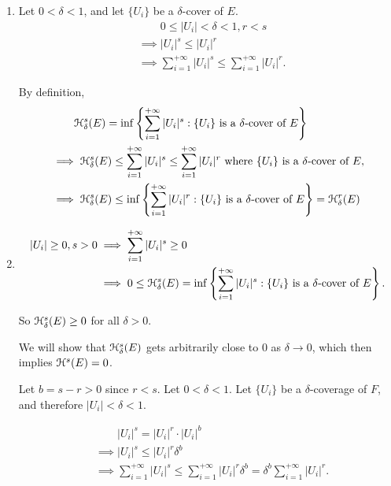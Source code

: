 \begin{enumerate}
    \item Let \(0 < \delta < 1\), and let \(\{U_i\}\) be a \(\delta\)-cover of \(E\).
    \begin{align*}
        &\phantom{\implies} 0 \leq |U_i| < \delta < 1, r < s\\
        &\implies |U_i|^s \leq |U_i|^r\\
        &\implies \sum_{i = 1}^{+\infty} |U_i|^s \leq \sum_{i = 1}^{+\infty} |U_i|^r.
    \end{align*}

    By definition,
    \begin{align*}
        &\phantom{\implies} \mathcal{H}_\delta^s(E) = \inf \left\{\sum_{i = 1}^{+\infty} |U_i|^s : \{U_i\} \text{ is a } \delta\text{-cover of } E\right\}\\
        &\implies \mathcal{H}_{\delta}^s(E) \leq \sum_{i = 1}^{+\infty} |U_i|^s \leq \sum_{i = 1}^{+\infty} |U_i|^r\text{ where } \{U_i\} \text{ is a } \delta\text{-cover of } E, \\
        &\implies \mathcal{H}_\delta^s(E) \leq \inf\left\{\sum_{i = 1}^{+\infty} |U_i|^r : \{U_i\} \text{ is a } \delta\text{-cover of } E\right\} = \mathcal{H}_\delta^r(E)
    \end{align*}

    \item
    \begin{align*}
        |U_i| \geq 0, s > 0 &\implies \sum_{i = 1}^{+\infty} |U_i|^s \geq 0\\
        &\implies 0 \leq \mathcal{H}_{\delta}^s(E) =  \inf \left\{\sum_{i = 1}^{+\infty} |U_i|^s : \{U_i\} \text{ is a } \delta\text{-cover of } E\right\}.
    \end{align*}

    So \(\mathcal{H}_{\delta}^s (E) \geq 0 \) for all \( \delta > 0\).

    We will show that \(\mathcal{H}_{\delta}^s(E)\) gets arbitrarily close to \(0\) as \(\delta \to 0\), which then implies \(\mathcal{H}^s(E) = 0\).

    Let \(b = s - r > 0\) since \(r < s\). Let \(0 < \delta < 1\). Let \(\{U_i\}\) be a \(\delta\)-coverage of \(F\), and therefore \(|U_i| < \delta < 1\).

    \begin{align*}
        &\phantom{\implies} |U_i|^s = |U_i|^r \cdot |U_i|^b\\
        &\implies |U_i|^s \leq |U_i|^r \delta^b\\
        &\implies \sum_{i = 1}^{+\infty} |U_i|^s \leq \sum_{i = 1}^{+\infty} |U_i|^r \delta^b = \delta^b \sum_{i = 1}^{+\infty} |U_i|^r.
    \end{align*}


\end{enumerate}
